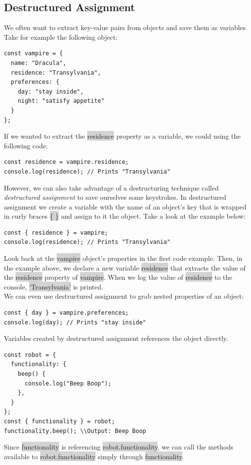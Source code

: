 \documentclass[11pt]{article}
\begin{document}
\subsection{Destructured Assignment}
We often want to extract key-value pairs from objects and save them as variables. Take for example the following object:
\begin{lstlisting}
const vampire = {
  name: "Dracula",
  residence: "Transylvania",
  preferences: {
    day: "stay inside",
    night: "satisfy appetite"
  }
};
\end{lstlisting}
If we wanted to extract the \colorbox{lightgray}{residence} property as a variable, we could using the following code:
\begin{lstlisting}
const residence = vampire.residence; 
console.log(residence); // Prints "Transylvania"
\end{lstlisting}
However, we can also take advantage of a destructuring technique called \textit{destructured assignment} to save ourselves some keystrokes. In destructured assignment we create a variable with the name of an object’s key that is wrapped in curly braces \colorbox{lightgray}{\{ \}} and assign to it the object. Take a look at the example below:
\begin{lstlisting}
const { residence } = vampire; 
console.log(residence); // Prints "Transylvania"
\end{lstlisting}
Look back at the \colorbox{lightgray}{vampire} object’s properties in the first code example. Then, in the example above, we declare a new variable \colorbox{lightgray}{residence} that extracts the value of the \colorbox{lightgray}{residence} property of \colorbox{lightgray}{vampire}. When we log the value of \colorbox{lightgray}{residence} to the console, \colorbox{lightgray}{`Transylvania'} is printed. \\
\newline
We can even use destructured assignment to grab nested properties of an object: 
\begin{lstlisting}
const { day } = vampire.preferences; 
console.log(day); // Prints "stay inside"
\end{lstlisting}
Variables created by destructured assignment references the object directly. 
\begin{lstlisting}
const robot = {
  functionality: {
    beep() {
      console.log("Beep Boop");
    },
  }
};
const { functionality } = robot; 
functionality.beep(); \\Output: Beep Boop
\end{lstlisting}
Since \colorbox{lightgray}{functionality} is referencing \colorbox{lightgray}{robot.functionality}, we can call the methods available to \colorbox{lightgray}{robot.functionality} simply through \colorbox{lightgray}{functionality}.
\end{document}
